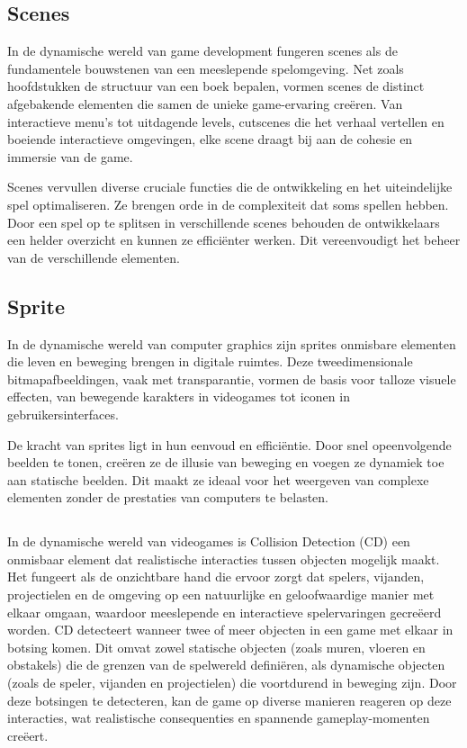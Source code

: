\subsection{Scenes}%
In de dynamische wereld van game development fungeren scenes als de fundamentele bouwstenen van een meeslepende spelomgeving. Net zoals hoofdstukken de structuur van een boek bepalen, vormen scenes de distinct afgebakende elementen die samen de unieke game-ervaring creëren. Van interactieve menu's tot uitdagende levels, cutscenes die het verhaal vertellen en boeiende interactieve omgevingen, elke scene draagt bij aan de cohesie en immersie van de game.

Scenes vervullen diverse cruciale functies die de ontwikkeling en het uiteindelijke spel optimaliseren. Ze brengen orde in de complexiteit dat soms spellen hebben. Door een spel op te splitsen in verschillende scenes behouden de ontwikkelaars een helder overzicht en kunnen ze efficiënter werken. Dit vereenvoudigt het beheer van de verschillende elementen.

\subsection{Sprite}
In de dynamische wereld van computer graphics zijn sprites onmisbare elementen die leven en beweging brengen in digitale ruimtes. Deze tweedimensionale bitmapafbeeldingen, vaak met transparantie, vormen de basis voor talloze visuele effecten, van bewegende karakters in videogames tot iconen in gebruikersinterfaces.

De kracht van sprites ligt in hun eenvoud en efficiëntie. Door snel opeenvolgende beelden te tonen, creëren ze de illusie van beweging en voegen ze dynamiek toe aan statische beelden. Dit maakt ze ideaal voor het weergeven van complexe elementen zonder de prestaties van computers te belasten.

\subsection{}
In de dynamische wereld van videogames is Collision Detection (CD) een onmisbaar element dat realistische interacties tussen objecten mogelijk maakt. Het fungeert als de onzichtbare hand die ervoor zorgt dat spelers, vijanden, projectielen en de omgeving op een natuurlijke en geloofwaardige manier met elkaar omgaan, waardoor meeslepende en interactieve spelervaringen gecreëerd worden.
CD detecteert wanneer twee of meer objecten in een game met elkaar in botsing komen. Dit omvat zowel statische objecten (zoals muren, vloeren en obstakels) die de grenzen van de spelwereld definiëren, als dynamische objecten (zoals de speler, vijanden en projectielen) die voortdurend in beweging zijn.
Door deze botsingen te detecteren, kan de game op diverse manieren reageren op deze interacties, wat realistische consequenties en spannende gameplay-momenten creëert.

